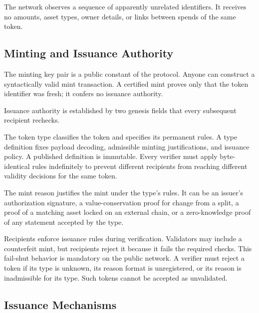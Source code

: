 The network observes a sequence of apparently unrelated identifiers. It receives no amounts, asset types, owner details, or links between spends of the same token.

\subsection{Minting and Issuance Authority}

The minting key pair is a public constant of the protocol. Anyone can construct a syntactically valid mint transaction. A certified mint proves only that the token identifier was fresh; it confers no issuance authority.

Issuance authority is established by two genesis fields that every subsequent recipient rechecks.

The token type classifies the token and specifies its permanent rules. A type definition fixes payload decoding, admissible minting justifications, and issuance policy. A published definition is immutable. Every verifier must apply byte-identical rules indefinitely to prevent different recipients from reaching different validity decisions for the same token.

The mint reason justifies the mint under the type's rules. It can be an issuer's authorization signature, a value-conservation proof for change from a split, a proof of a matching asset locked on an external chain, or a zero-knowledge proof of any statement accepted by the type.

Recipients enforce issuance rules during verification. Validators may include a counterfeit mint, but recipients reject it because it fails the required checks. This fail-shut behavior is mandatory on the public network. A verifier must reject a token if its type is unknown, its reason format is unregistered, or its reason is inadmissible for its type. Such tokens cannot be accepted as unvalidated.

\subsection{Issuance Mechanisms}

